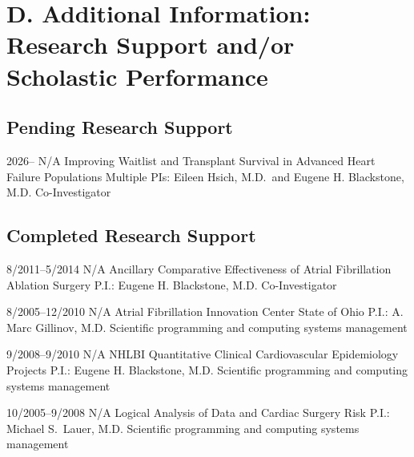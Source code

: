 \documentclass{nihbiosketch}
\begin{document}
\section*{D. Additional Information: Research Support and/or Scholastic
Performance}

\subsection*{Pending Research Support}

          {2026--}
          {N/A}
          {Improving Waitlist and Transplant Survival in Advanced Heart Failure
           Populations}
          {Multiple PIs: Eileen Hsich, M.D.\ and Eugene H. Blackstone, M.D.}
          {Co-Investigator}

\subsection*{Completed Research Support}

          {8/2011--5/2014}
          {N/A}
          {Ancillary Comparative Effectiveness of Atrial Fibrillation Ablation
           Surgery}
          {P.I.: Eugene H. Blackstone, M.D.}
          {Co-Investigator}

          {8/2005--12/2010}
          {N/A}
          {Atrial Fibrillation Innovation Center State of Ohio}
          {P.I.: A. Marc Gillinov, M.D.}
          {Scientific programming and computing systems management}

          {9/2008--9/2010}
          {N/A}
          {NHLBI Quantitative Clinical Cardiovascular Epidemiology Projects}
          {P.I.: Eugene H. Blackstone, M.D.}
          {Scientific programming and computing systems management}

          {10/2005--9/2008}
          {N/A}
          {Logical Analysis of Data and Cardiac Surgery Risk}
          {P.I.: Michael S.\ Lauer, M.D.}
          {Scientific programming and computing systems management}
\end{document}
